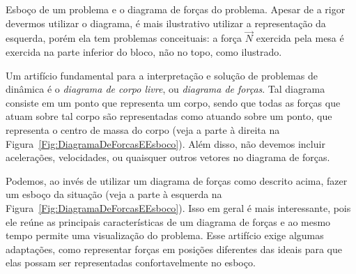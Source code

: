 \begin{marginfigure}
\centering
{}
\caption{Esboço de um problema e o diagrama de forças do problema. Apesar de a rigor devermos utilizar o diagrama, é mais ilustrativo utilizar a representação da esquerda, porém ela tem problemas conceituais: a força $\vec{N}$ exercida pela mesa é exercida na parte inferior do bloco, não no topo, como ilustrado.\label{Fig:DiagramaDeForcasEEsboco}}
\end{marginfigure}

Um artifício fundamental para a interpretação e solução de problemas de dinâmica é o \emph{diagrama de corpo livre}, ou \emph{diagrama de forças}. Tal diagrama consiste em um ponto que representa um corpo, sendo que todas as forças que atuam sobre tal corpo são representadas como atuando sobre um ponto, que representa o centro de massa do corpo (veja a parte à direita na Figura~\ref{Fig:DiagramaDeForcasEEsboco}). Além disso, não devemos incluir acelerações, velocidades, ou quaisquer outros vetores no diagrama de forças.

Podemos, ao invés de utilizar um diagrama de forças como descrito acima, fazer um esboço da situação (veja a parte à esquerda na Figura~\ref{Fig:DiagramaDeForcasEEsboco}). Isso em geral é mais interessante, pois ele reúne as principais características de um diagrama de forças e ao mesmo tempo permite uma visualização do problema. Esse artifício exige algumas adaptações, como representar forças em posições diferentes das ideais para que elas possam ser representadas confortavelmente no esboço.

